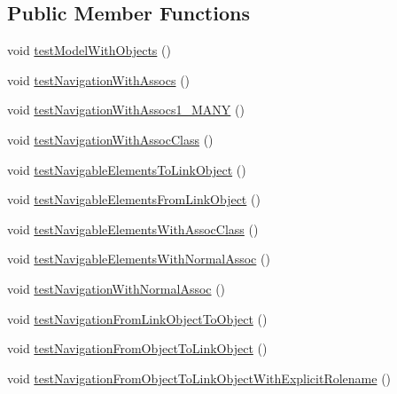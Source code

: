 \subsection*{Public Member Functions}
\begin{DoxyCompactItemize}
\item 
void \hyperlink{classorg_1_1tzi_1_1use_1_1uml_1_1ocl_1_1expr_1_1_expr_navigation_test_ade93391d72e7727f8c4366c87fff2d9d}{test\-Model\-With\-Objects} ()
\item 
void \hyperlink{classorg_1_1tzi_1_1use_1_1uml_1_1ocl_1_1expr_1_1_expr_navigation_test_ab13d802752a29d00ca6cb9461e2e251c}{test\-Navigation\-With\-Assocs} ()
\item 
void \hyperlink{classorg_1_1tzi_1_1use_1_1uml_1_1ocl_1_1expr_1_1_expr_navigation_test_a2395e8bc5b164a93f39074bb8ea23c20}{test\-Navigation\-With\-Assocs1\-\_\-\-M\-A\-N\-Y} ()
\item 
void \hyperlink{classorg_1_1tzi_1_1use_1_1uml_1_1ocl_1_1expr_1_1_expr_navigation_test_a6251e082f94595c639f99df7b38648ce}{test\-Navigation\-With\-Assoc\-Class} ()
\item 
void \hyperlink{classorg_1_1tzi_1_1use_1_1uml_1_1ocl_1_1expr_1_1_expr_navigation_test_ad8ddd348a66b28bd751e03675ee190f5}{test\-Navigable\-Elements\-To\-Link\-Object} ()
\item 
void \hyperlink{classorg_1_1tzi_1_1use_1_1uml_1_1ocl_1_1expr_1_1_expr_navigation_test_aff53b5dd302464180a1a3679b9ac2569}{test\-Navigable\-Elements\-From\-Link\-Object} ()
\item 
void \hyperlink{classorg_1_1tzi_1_1use_1_1uml_1_1ocl_1_1expr_1_1_expr_navigation_test_a5d5e6aa49298cd297aa7205e07d532b2}{test\-Navigable\-Elements\-With\-Assoc\-Class} ()
\item 
void \hyperlink{classorg_1_1tzi_1_1use_1_1uml_1_1ocl_1_1expr_1_1_expr_navigation_test_a4a693d68b918f23400dc9a12752ed9e6}{test\-Navigable\-Elements\-With\-Normal\-Assoc} ()
\item 
void \hyperlink{classorg_1_1tzi_1_1use_1_1uml_1_1ocl_1_1expr_1_1_expr_navigation_test_af4b2a2791c7db39df8b7c1baaadffa6b}{test\-Navigation\-With\-Normal\-Assoc} ()
\item 
void \hyperlink{classorg_1_1tzi_1_1use_1_1uml_1_1ocl_1_1expr_1_1_expr_navigation_test_a67c6513a11529708df3aef334ab80e11}{test\-Navigation\-From\-Link\-Object\-To\-Object} ()
\item 
void \hyperlink{classorg_1_1tzi_1_1use_1_1uml_1_1ocl_1_1expr_1_1_expr_navigation_test_a7a9a157a452b22b7d1216c0e3a3b12cf}{test\-Navigation\-From\-Object\-To\-Link\-Object} ()
\item 
void \hyperlink{classorg_1_1tzi_1_1use_1_1uml_1_1ocl_1_1expr_1_1_expr_navigation_test_a7252c7713668f96bab42c36c8a90d9a7}{test\-Navigation\-From\-Object\-To\-Link\-Object\-With\-Explicit\-Rolename} ()
\end{DoxyCompactItemize}
